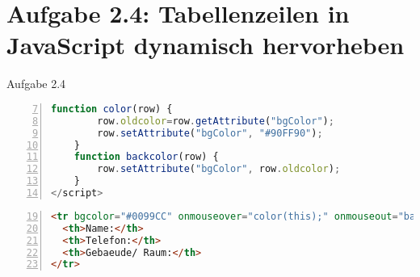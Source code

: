 \section{Aufgabe 2.4: Tabellenzeilen in JavaScript dynamisch hervorheben}
\begin{frame}[<+->][fragile]{Aufgabe 2.4}
\tiny{ \begin{lstlisting}[language=JavaScript, 
		   numbers=left,
		   numbersep=3pt,
		   firstnumber= 7,
		   breaklines=true]
	function color(row) {
		row.oldcolor=row.getAttribute("bgColor");
		row.setAttribute("bgColor", "#90FF90");
	}
	function backcolor(row) {
		row.setAttribute("bgColor", row.oldcolor);
	}
</script>
\end{lstlisting}}	
\tiny{ \begin{lstlisting}[language = HTML,
                                   mathescape = true,  
                   numbers = left,
	        firstnumber=19 , 
                   numbersep = 3pt]
<tr bgcolor="#0099CC" onmouseover="color(this);" onmouseout="backcolor(this)">
  <th>Name:</th>
  <th>Telefon:</th>
  <th>Gebaeude/ Raum:</th>
</tr>
\end{lstlisting}}
\normalsize

\end{frame}